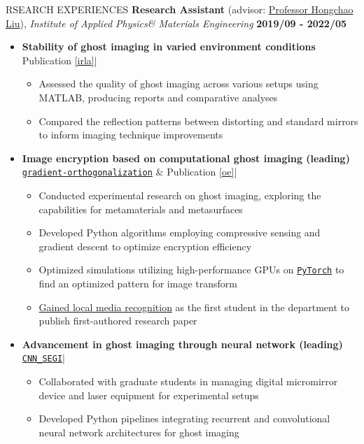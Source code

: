 \documentclass[10pt]{article} %
\begin{document}
\begin{section}{RSEARCH EXPERIENCES}
\textbf{Research Assistant} (advisor: \href{mailto:hcliu@um.edu.mo}{Professor Hongchao Liu}), \textit{Institute of Applied Physics\& Materials Engineering} \hfill \textbf{2019/09 - 2022/05} 
\begin{itemize}[leftmargin=1.5em]
    \item \textbf{Stability of ghost imaging in varied environment conditions} 
    \hfill {\footnotesize Publication \ref{irla}}| %
    \begin{itemize}[leftmargin=1.5em]
        \item Assessed the quality of ghost imaging across various setups using MATLAB, producing reports and comparative analyses
        \item Compared the reflection patterns between distorting and standard mirrors to inform imaging technique improvements
    \end{itemize}
    \item \textbf{Image encryption based on computational ghost imaging (leading)} 
    \hfill {\footnotesize \href{https://github.com/Chisen-Lupus/gradient-orthogonalization}{\texttt{gradient-orthogonalization}} \& Publication \ref{oe}}| %
    \begin{itemize}[leftmargin=1.5em]
        \item Conducted experimental research on ghost imaging, exploring the capabilities for metamaterials and metasurfaces
        \item Developed Python algorithms employing compressive sensing and gradient descent to optimize encryption efficiency
        \item Optimized simulations utilizing high-performance GPUs on \href{https://pytorch.org/}{\texttt{PyTorch}} to find an optimized pattern for image transform
        \item \href{https://www.tdm.com.mo/en/news-detail/683438?isvideo=false&lang=en&category=all}{Gained local media recognition} as the first student in the department to publish first-authored research paper
    \end{itemize}
    \item \textbf{Advancement in ghost imaging through neural network (leading)} 
    \hfill {\footnotesize \href{https://github.com/Chisen-Lupus/CNN_SEGI}{\texttt{CNN\_SEGI}}}| %
    \begin{itemize}[leftmargin=1.5em]
        \item Collaborated with graduate students in managing digital micromirror device and laser equipment for experimental setups
        \item Developed Python pipelines integrating recurrent and convolutional neural network architectures for ghost imaging
    \end{itemize}
\end{itemize}


\end{section}
\end{document}
